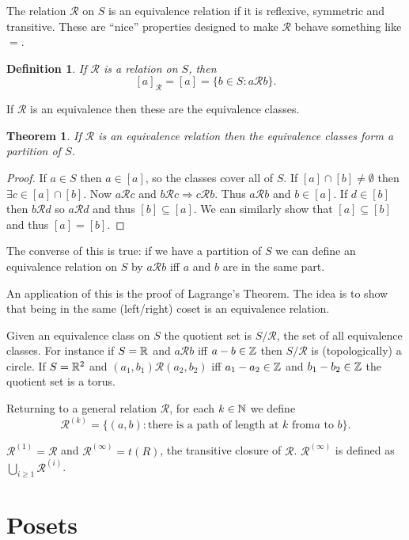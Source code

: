 \documentclass{notes}
\theoremstyle{plain}
\newtheorem{theorem}{Theorem}[chapter]
\newtheorem*{definition}{Definition}
\newcommand{\rel}{\mathrel{\mathcal{R}}}
\newcommand{\relset}{\mathcal{R}}
\begin{document}
The relation $\relset$ on $S$ is an equivalence relation if it is reflexive,
symmetric and transitive.  These are ``nice'' properties designed to make
$\relset$ behave something like $=$.

\begin{definition}
If $\relset$ is a relation on $S$, then
\[
[a]_\relset = [a] = \{ b \in S : a \rel b \}.
\]
\end{definition}

If $\relset$ is an equivalence then these are the equivalence classes.

\begin{theorem}
If $\relset$ is an equivalence relation then the equivalence classes
form a partition of $S$.
\end{theorem}

\begin{proof}
If $a \in S$ then $a \in [a]$, so the classes cover all of $S$.  If
$[a] \cap [b] \neq \emptyset$ then $\exists c \in [a] \cap [b]$.  Now
$a \rel c$ and $b \rel c \Rightarrow c \rel b$.  Thus $a \rel b$ and
$b \in [a]$.  If $d \in [b]$ then $b \rel d$ so $a \rel d$ and thus
$[b] \subseteq [a]$.  We can similarly show that $[a] \subseteq [b]$
and thus $[a] = [b]$.
\end{proof}

The converse of this is true: if we have a partition of $S$ we can
define an equivalence relation on $S$ by $a \rel b$ iff $a$ and $b$ are in
the same part.

An application of this is the proof of Lagrange's Theorem.  The idea
is to show that being in the same (left/right) coset is an equivalence
relation.

Given an equivalence class on $S$ the quotient set is $S/\relset$, the
set of all equivalence classes.  For instance if $S=\mathbb{R}$ and
$a \rel b$ iff $a - b \in \mathbb{Z}$ then $S/\relset$ is (topologically) a circle.
If $S = \mathbb{R}^2$ and $(a_1,b_1) \rel (a_2,b_2)$ iff $a_1 - a_2 \in \mathbb{Z}$ and
$b_1 - b_2 \in \mathbb{Z}$ the quotient set is a torus.

Returning to a general relation $\relset$, for each $k \in \mathbb{N}$ we define
\[
\relset^{(k)} = \{ (a,b) : \text{there is a path of length at $k$ from
$a$ to $b$} \}.
\]

$\relset^{(1)} = \relset$ and $\relset^{(\infty)} = t(R)$, the transitive
closure of $\relset$.  $\relset^{(\infty)}$ is defined as
$\bigcup_{i \ge 1} \relset^{(i)}$.

\section{Posets}
\end{document}
